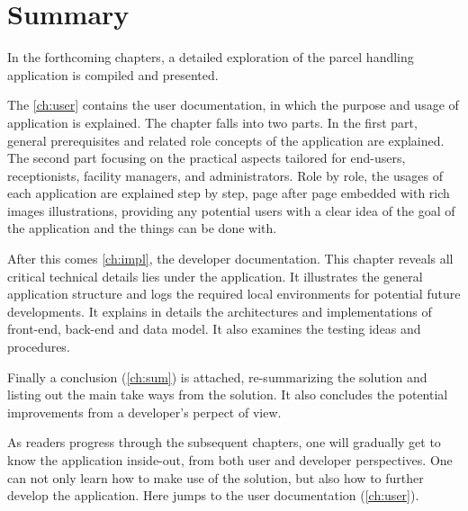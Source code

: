 \section{Summary}
\label{sec:IntroSum}

In the forthcoming chapters, a detailed exploration of the parcel handling application is compiled and presented. 

The \autoref{ch:user} contains the user documentation, in which the purpose and usage of application is explained. The chapter falls into two parts. In the first part, general prerequisites and related role concepts of the application are explained. The second part focusing on the practical aspects tailored for end-users, receptionists, facility managers, and administrators. Role by role, the usages of each application are explained step by step, page after page embedded with rich images illustrations, providing any potential users with a clear idea of the goal of the application and the things can be done with. 

After this comes \autoref{ch:impl}, the developer documentation. This chapter reveals all critical technical details lies under the application. It illustrates the general application structure and logs the required local environments for potential future developments. It explains in details the architectures and implementations of front-end, back-end and data model. It also examines the testing ideas and procedures. 

Finally a conclusion (\autoref{ch:sum}) is attached, re-summarizing the solution and listing out the main take ways from the solution. It also concludes the potential improvements from a developer's perpect of view.

As readers progress through the subsequent chapters, one will gradually get to know the application inside-out, from both user and developer perspectives. One can not only learn how to make use of the solution, but also how to further develop the application.
Here jumps to the user documentation (\autoref{ch:user}).




